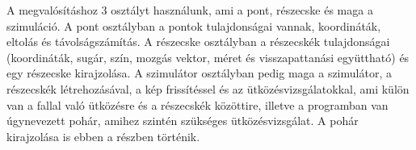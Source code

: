 A megvalósításhoz 3 osztályt használunk, ami a pont, részecske és maga a szimuláció. A pont osztályban a pontok tulajdonságai vannak, koordináták, eltolás és távolságszámítás.  A részecske osztályban  a részecskék tulajdonságai (koordináták, sugár, szín, mozgás vektor, méret és visszapattanási együttható) és egy részecske kirajzolása. A szimulátor osztályban pedig maga a szimulátor, a részecskék létrehozásával, a kép frissítéssel és az ütközésvizsgálatokkal, ami külön van a fallal való ütközésre és a részecskék közöttire, illetve a programban van úgynevezett pohár, amihez szintén szükséges ütközésvizsgálat. A pohár kirajzolása is ebben a részben történik. 

